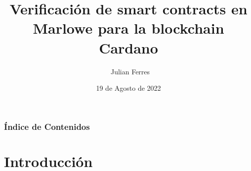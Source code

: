 \documentclass{beamer}
\title[Verificación de smart contracts en Marlowe]%
{Verificación de smart contracts en Marlowe para la blockchain Cardano}
\author[Julian Ferres] %
{~Julian Ferres}
\institute[FIUBA] %
{
  Facultad de Ingeniería\\Universidad de Buenos Aires.
}
\date{19 de Agosto de 2022}
\begin{document}



\begin{frame}
	\titlepage
\end{frame}


\begin{frame} 
	\footnotesize
	\frametitle{Índice de Contenidos}
	\tableofcontents
\end{frame}

%
%
%
%
%
%
%
%

\section{Introducción}
\end{document}
